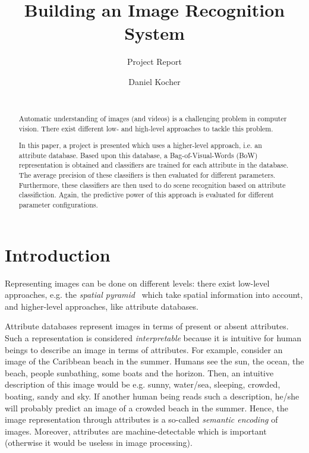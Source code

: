 \documentclass{vldb}
\begin{document}
\title{Building an Image Recognition System}
\subtitle{Project Report}


\author{
\alignauthor
	Daniel Kocher\\
  \\
}

\maketitle

\begin{abstract}
Automatic understanding of images (and videos) is a challenging problem in
computer vision. There exist different low- and high-level approaches to tackle
this problem.

In this paper, a project is presented which uses a higher-level approach, i.e. an
attribute database. Based upon this database, a Bag-of-Visual-Words (BoW)
representation is obtained and classifiers are trained for each attribute in the
database. The average precision of these classifiers is then evaluated for
different parameters. Furthermore, these classifiers are then used to do scene
recognition based on attribute classifiction. Again, the predictive power of this
approach is evaluated for different parameter configurations.
\end{abstract}

\section{Introduction}
\label{sec:introduction}

Representing images can be done on different levels: there exist
low-level approaches, e.g. the \emph{spatial pyramid}~\cite{Lazebnik:2006} which
take spatial information into account, and higher-level approaches, like attribute
databases.

Attribute databases represent images in terms of present or absent attributes.
Such a representation is considered \emph{interpretable} because it is intuitive
for human beings to describe an image in terms of attributes. For example,
consider an image of the Caribbean beach in the summer. Humans see the sun, the
ocean, the beach, people sunbathing, some boats and the horizon. Then, an
intuitive description of this image would be e.g. sunny, water/sea, sleeping,
crowded, boating, sandy and sky. If another human being reads such a description,
he/she will probably predict an image of a crowded beach in the summer. Hence,
the image representation through attributes is a so-called
\emph{semantic encoding} of images. Moreover, attributes are machine-detectable
which is important (otherwise it would be useless in image processing).
\end{document}
